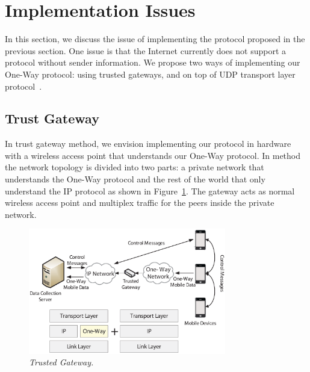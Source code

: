 \section{Implementation Issues}\label{sec-imp}

In this section, we discuss the issue of implementing the protocol proposed
in the previous section. One issue is that the Internet currently does not
support a protocol without sender information. We propose two ways of
implementing our One-Way protocol: using trusted gateways, and on top of
UDP transport layer protocol~\cite{RFC768}.

\subsection{Trust Gateway}

In trust gateway method, we envision implementing our protocol in hardware
with a wireless access point that understands our One-Way protocol.
In method the network topology is divided into two parts: a private
network that understands the One-Way protocol and the rest of the world that
only understand the IP protocol as shown in Figure~\ref{fig:gateway}. The
gateway acts as normal wireless access point and multiplex traffic for the
peers inside the private network.

\begin{figure}[h]
\begin{center}
\includegraphics[width=3.4in]{one-way-gateway.eps}
\caption{\small \sl Trusted Gateway.\label{fig:gateway}}
\end{center}
\end{figure}


